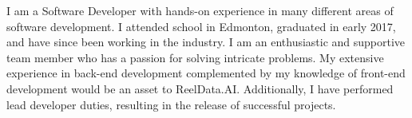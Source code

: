 I am a Software Developer with hands-on experience in many different areas of software development.  I attended school in Edmonton, graduated in early 2017, and have since been working in the industry.  I am an enthusiastic and supportive team member who has a passion for solving intricate problems.  My extensive experience in back-end development complemented by my knowledge of front-end development would be an asset to ReelData.AI.  Additionally, I have performed lead developer duties, resulting in the release of successful projects.